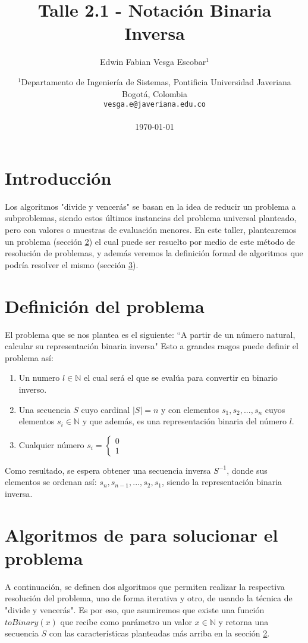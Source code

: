\documentclass[letter]{article}
\title{Talle 2.1 - Notación Binaria Inversa}
\author{Edwin Fabian Vesga Escobar$^1$}
\date{
	$^1$Departamento de Ingeniería de Sistemas, Pontificia Universidad Javeriana\\Bogotá,  Colombia \\
	\texttt{vesga.e@javeriana.edu.co}\\~\\
	\today
}
\begin{document}
\maketitle

\tableofcontents

\section{Introducción} \label{intro}
\justify Los algoritmos "divide y vencerás" se basan en la idea de reducir un problema a subproblemas, siendo estos últimos instancias del problema universal planteado, pero con valores o muestras de evaluación menores. En este taller, plantearemos un problema (sección \ref{problema}) el cual puede ser resuelto por medio de este método de resolución de problemas, y además veremos la definición formal de algoritmos que podría resolver el mismo (sección \ref{algoritmos}).

\section{Definición del problema} \label{problema}
\justify El problema que se nos plantea es el siguiente: \hfill \break \break
\centering ``A partir de un número natural, calcular su representación binaria inversa" \break
\flushleft \justify Esto a grandes rasgos puede definir el problema así:
\begin{enumerate}
    \item Un numero $l\in\mathbb{N}$ el cual será el que se evalúa para convertir en binario inverso.
    \item Una secuencia $S$ cuyo cardinal $|S|=n$ y con elementos $s_1,s_2,...,s_n$ cuyos elementos $s_i\in\mathbb{N}$ y que además, es una representación binaria del número $l$.
    \item Cualquier número $s_i = \begin{cases} 
        0 \\
        1
    \end{cases}$
\end{enumerate}

Como resultado, se espera obtener una secuencia inversa $S^{-1}$, donde sus elementos se ordenan así: $s_n, s_{n-1},...,s_2,s_1$, siendo la representación binaria inversa.
\section{Algoritmos de para solucionar el problema} \label{algoritmos}
A continuación, se definen dos algoritmos que permiten realizar la respectiva resolución del problema, uno de forma iterativa y otro, de usando la técnica de "divide y vencerás". Es por eso, que asumiremos que existe una función $toBinary(x)$ que recibe como parámetro un valor $x \in\mathbb{N}$ y retorna una secuencia $S$ con las características planteadas más arriba en la sección \ref{problema}.
\end{document}
